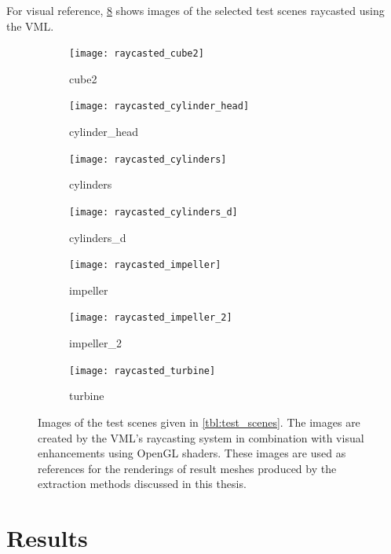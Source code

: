 For visual reference, \cref{fig:raycasted_scenes} shows images of the selected test scenes raycasted using the VML.
%
\begin{figure}[!]
	\centering
	\begin{subfigure}[b]{0.43\textwidth}
		\centering
		\texttt{[image: raycasted\_cube2]}
		\caption{cube2}
		\label{fig:cube2_raycasted}
	\end{subfigure}
	\begin{subfigure}[b]{0.43\textwidth}
		\centering
		\texttt{[image: raycasted\_cylinder\_head]}
		\caption{cylinder\_head}
		\label{fig:cylinder_head_raycasted}
	\end{subfigure}
	\begin{subfigure}[b]{0.43\textwidth}
		\centering
		\texttt{[image: raycasted\_cylinders]}
		\caption{cylinders}
		\label{fig:cylinders_raycasted}
	\end{subfigure}
	\begin{subfigure}[b]{0.43\textwidth}
		\centering
		\texttt{[image: raycasted\_cylinders\_d]}
		\caption{cylinders\_d}
		\label{fig:cylinders_d_raycasted}
	\end{subfigure}
	\begin{subfigure}[b]{0.43\textwidth}
		\centering
		\texttt{[image: raycasted\_impeller]}
		\caption{impeller}
		\label{fig:impeller_raycasted}
	\end{subfigure}
	\begin{subfigure}[b]{0.43\textwidth}
		\centering
		\texttt{[image: raycasted\_impeller\_2]}
		\caption{impeller\_2}
		\label{fig:impeller_2_raycasted}
	\end{subfigure}
	\begin{subfigure}[b]{0.43\textwidth}
		\centering
		\texttt{[image: raycasted\_turbine]}
		\caption{turbine}
		\label{fig:turbine_raycasted}
	\end{subfigure}
	\caption{
		Images of the test scenes given in \cref{tbl:test_scenes}.
		The images are created by the VML's raycasting system in combination with visual enhancements using OpenGL shaders.
		These images are used as references for the renderings of result meshes produced by the extraction methods discussed in this thesis.
	}
	\label{fig:raycasted_scenes}
\end{figure}

\section{Results}
\label{sec:direct_intersection_results}

